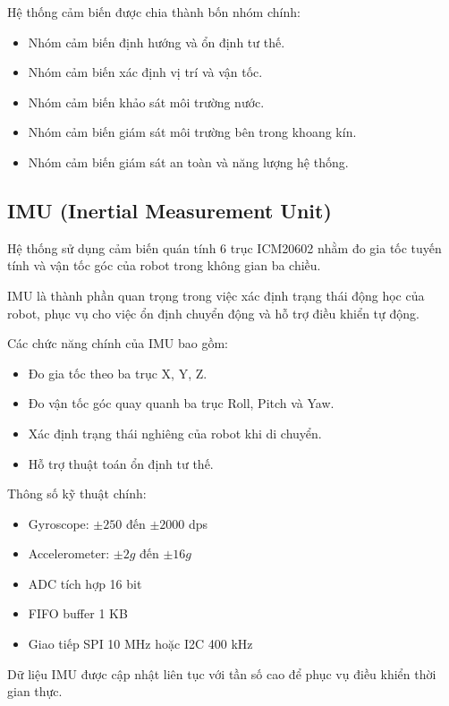 \documentclass[../DoAn.tex]{subfiles}
\begin{document}
Hệ thống cảm biến được chia thành bốn nhóm chính:

\begin{itemize}
    \item Nhóm cảm biến định hướng và ổn định tư thế.
    \item Nhóm cảm biến xác định vị trí và vận tốc.
    \item Nhóm cảm biến khảo sát môi trường nước.
    \item Nhóm cảm biến giám sát môi trường bên trong khoang kín.
    \item Nhóm cảm biến giám sát an toàn và năng lượng hệ thống.
\end{itemize}

\subsection{IMU (Inertial Measurement Unit)}

Hệ thống sử dụng cảm biến quán tính 6 trục ICM20602 nhằm đo gia tốc tuyến tính và vận tốc góc của robot trong không gian ba chiều.

IMU là thành phần quan trọng trong việc xác định trạng thái động học của robot, phục vụ cho việc ổn định chuyển động và hỗ trợ điều khiển tự động.

Các chức năng chính của IMU bao gồm:

\begin{itemize}
    \item Đo gia tốc theo ba trục X, Y, Z.
    \item Đo vận tốc góc quay quanh ba trục Roll, Pitch và Yaw.
    \item Xác định trạng thái nghiêng của robot khi di chuyển.
    \item Hỗ trợ thuật toán ổn định tư thế.
\end{itemize}

Thông số kỹ thuật chính:

\begin{itemize}
    \item Gyroscope: $\pm250$ đến $\pm2000$ dps
    \item Accelerometer: $\pm2g$ đến $\pm16g$
    \item ADC tích hợp 16 bit
    \item FIFO buffer 1 KB
    \item Giao tiếp SPI 10 MHz hoặc I2C 400 kHz
\end{itemize}

Dữ liệu IMU được cập nhật liên tục với tần số cao để phục vụ điều khiển thời gian thực.
\end{document}
